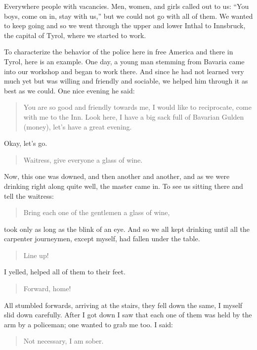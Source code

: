 Everywhere people with vacancies. Men, women, and girls called out to us: ``You boys, come on in, stay with us,'' but we could not go with all of them. We wanted to keep going and so we went through the upper and lower Inthal to Innsbruck, the capital of Tyrol, where we started to work.

To characterize the behavior of the police here in free America and there in Tyrol, here is an example. One day, a young man stemming from Bavaria came into our workshop and began to work there. And since he had not learned very much yet but was willing and friendly and sociable, we helped him through it as best as we could. One nice evening he said:

\begin{quote}
You are so good and friendly towards me, I would like to reciprocate, come with me to the Inn. Look here, I have a big sack full of Bavarian Gulden (money), let's have a great evening.
\end{quote}

Okay, let's go.

\begin{quote}
Waitress, give everyone a glass of wine.
\end{quote}

Now, this one was downed, and then another and another, and as we were drinking right along quite well, the master came in. To see us sitting there and tell the waitress:

\begin{quote}
Bring each one of the gentlemen a glass of wine,
\end{quote}

took only as long as the blink of an eye. And so we all kept drinking until all the carpenter journeymen, except myself, had fallen under the table.

\begin{quote}
Line up!
\end{quote}

I yelled, helped all of them to their feet.

\begin{quote}
Forward, home!
\end{quote}

All stumbled forwards, arriving at the stairs, they fell down the same, I myself slid down carefully. After I got down I saw that each one of them was held by the arm by a policeman; one wanted to grab me too. I said:

\begin{quote}
Not necessary, I am sober.
\end{quote}

